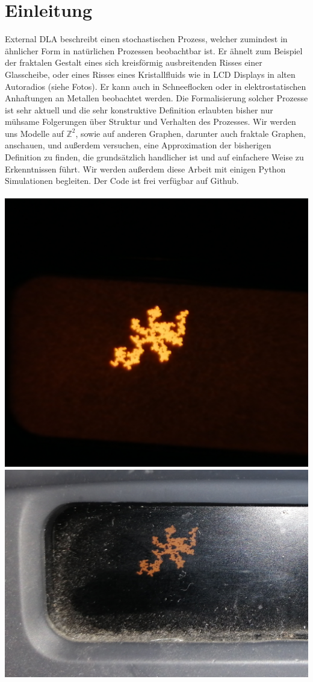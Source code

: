 \documentclass[12pt,a4paper]{scrartcl}
\numberwithin{equation}{section}
\numberwithin{equation}{section}%
\theoremstyle{definition}
\theoremstyle{definition}
\begin{document}
\section{Einleitung}
External DLA beschreibt einen stochastischen Prozess, welcher zumindest in ähnlicher Form in natürlichen Prozessen beobachtbar ist. Er ähnelt zum Beispiel der fraktalen Gestalt eines sich kreisförmig ausbreitenden Risses einer Glasscheibe, oder eines Risses eines Kristallfluids wie in LCD Displays in alten Autoradios (siehe Fotos). Er kann auch in Schneeflocken oder in elektrostatischen Anhaftungen an Metallen beobachtet werden. Die Formalisierung solcher Prozesse ist sehr aktuell und die sehr konstruktive Definition erlaubten bisher nur mühsame Folgerungen über Struktur und Verhalten des Prozesses. Wir werden uns Modelle auf $\mathbb{Z}^2$, sowie auf anderen Graphen, darunter auch fraktale Graphen, anschauen, und außerdem versuchen, eine Approximation der bisherigen Definition zu finden, die grundsätzlich handlicher ist und auf einfachere Weise zu Erkenntnissen führt. Wir werden außerdem diese Arbeit mit einigen Python Simulationen begleiten. Der Code ist frei verfügbar auf Github. \\
\\

\includegraphics[scale=0.04]{display.jpg} 
\includegraphics[scale=0.091]{display2.jpg} 
\end{document}
